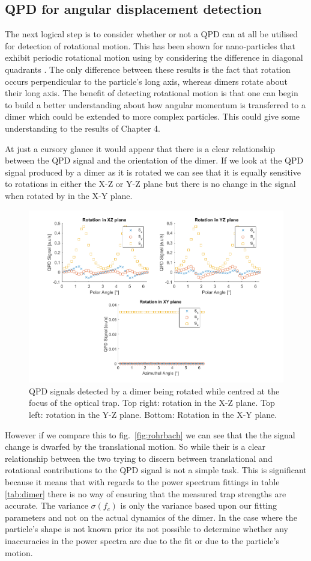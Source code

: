 \subsection{QPD for angular displacement detection}
The next logical step is to consider whether or not a QPD can at 
all be utilised for detection of rotational motion. This has been
shown for nano-particles that exhibit periodic rotational motion
using by considering the difference in diagonal quadrants 
\cite{Yifat2021}. The only difference between these results is 
the fact that rotation occurs perpendicular to the particle's long 
axis, whereas dimers rotate about their long axis. The benefit of 
detecting rotational motion is that one can begin to build a better understanding about how angular momentum is transferred to a dimer 
which could be extended to more complex particles. This could give 
some understanding to the results of Chapter 4. 

At just a cursory glance it would appear that there is a clear
relationship between the QPD signal and the orientation of the 
dimer. If we look at the QPD signal produced by a dimer as it is 
rotated we can see that it is equally sensitive to rotations in
either the X-Z or Y-Z plane but there is no change in the signal 
when rotated by in the X-Y plane. 
\begin{figure}
	\centering
	\includegraphics[width=0.9\linewidth]{rotation_figure}
	\caption{QPD signals detected by a dimer being rotated while
			centred at the focus of the optical trap. Top right:
			rotation in the X-Z plane. Top left: rotation in the
			Y-Z plane. Bottom: Rotation in the X-Y plane.}
	\label{fig:QPD_rotation}
\end{figure}

However if we compare this to fig.~\ref{fig:rohrbach} we can see 
that the the signal change is dwarfed by the translational motion. 
So while their is a clear relationship between the two trying to
discern between translational and rotational contributions to the
QPD signal is not a simple task. This is significant because it 
means that with regards to the power spectrum fittings in table 
\ref{tab:dimer} there is no way of ensuring that the measured 
trap strengths are accurate. The variance $\sigma(f_c)$ is only 
the variance based upon our fitting parameters and not on the 
actual dynamics of the dimer. In the case where the particle's
shape is not known prior its not possible to determine whether 
any inaccuracies in the power spectra are due to the fit or due
to the particle's motion.

